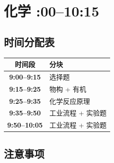 \chapter{化学 :00--10:15}

\section{时间分配表}

\begin{center}
\begin{tabular}{@{} >{\bfseries}c l @{}}
    \toprule
    时间段 & 分块 \\
    \midrule
    9:00--9:15 & 选择题 \\
    9:15--9:25 & 物构 + 有机 \\
    9:25--9:35 & 化学反应原理 \\
    9:35--9:50 & 工业流程 + 实验题 \\
    9:50--10:05 & 工业流程 + 实验题 \\
    \bottomrule
\end{tabular}
\end{center}

\section{注意事项}

